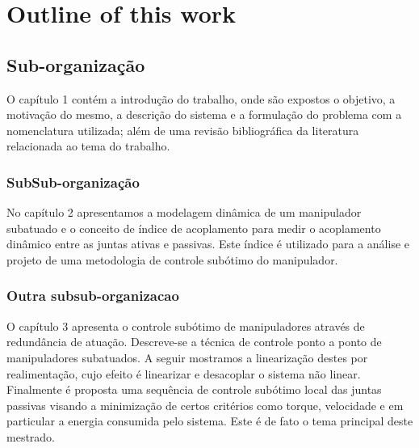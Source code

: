 


\section{Outline of this work}
\subsection{Sub-organização}
O capítulo 1 contém a introdução do trabalho, onde são expostos o objetivo, a motivação do mesmo, a descrição do sistema e a formulação do problema com a nomenclatura utilizada; além de uma revisão bibliográfica da literatura relacionada ao tema do trabalho.

\subsubsection{SubSub-organização}

No capítulo 2 apresentamos a modelagem dinâmica de um manipulador subatuado e o conceito de índice de acoplamento para medir o acoplamento dinâmico entre as juntas ativas e passivas. Este índice é utilizado para a análise e projeto de uma metodologia de controle subótimo do manipulador.

\subsubsection{Outra subsub-organizacao}

O capítulo 3 apresenta o controle subótimo de manipuladores através de redundância de atuação. Descreve-se a técnica de controle ponto a ponto de manipuladores subatuados. A seguir mostramos  a linearização destes por realimentação, cujo efeito é linearizar e desacoplar o sistema não linear. Finalmente é proposta uma sequência de controle subótimo local das juntas passivas visando a minimização de certos critérios como torque, velocidade e em particular a energia consumida pelo sistema. Este é de fato o tema principal deste mestrado.


